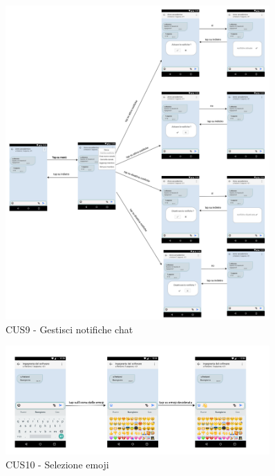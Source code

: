 \begin{figure}
	\centering
	\includegraphics[width=0.9\textwidth]{imgs/gruppo6/activities/act_cus9_gestisci_notifiche_chat.pdf}
	\caption{CUS9 - Gestisci notifiche chat}
	\label{fig:act-cus9}
\end{figure}

\begin{figure}
	\centering
	\includegraphics[width=0.9\textwidth]{imgs/gruppo6/activities/act_cus10_seleziona_emoji.pdf}
	\caption{CUS10 - Selezione emoji}
	\label{fig:act-cus10}
\end{figure}

